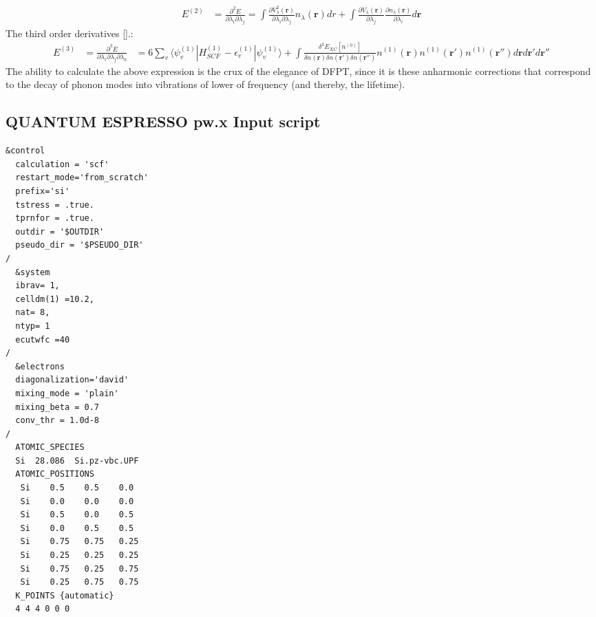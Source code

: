 \documentclass{article}
\numberwithin{equation}{section}
\begin{document}
\begin{spacing}{1.0}
\begin{align*}
E^{(2)}&=\frac{\partial^2 E}{\partial \lambda_i\partial \lambda_j}=\int \frac{\partial V^2_{\lambda}(\pmb{r})}{\partial \lambda_i\partial \lambda_j}n_{\lambda}(\pmb{r})dr+\int\frac{\partial V_{\lambda}(\pmb{r})}{\partial \lambda_j}\frac{\partial n_{\lambda}(\pmb{r})}{\partial \lambda_i}d\pmb{r}
\end{align*}
The third order derivatives [].:
\begin{align*}
E^{(3)}&=\frac{\partial^3 E}{\partial \lambda_i\partial \lambda_j\partial \lambda_k}&=6 \sum_v\langle\psi_v^{(1)}|H^{(1)}_{SCF}-\epsilon_v^{(1)}|\psi_v^{(1)}\rangle +\int \frac{\delta^3E_{XC}[n^{(0)}]}{\delta n(\pmb{r}) \delta n(\pmb{r'}) \delta n(\pmb{r''})}n^{(1)}(\pmb{r})n^{(1)}(\pmb{r'}) n^{(1)}(\pmb{r''}) d\pmb{r}d\pmb{r'}d\pmb{r''}
\end{align*}
The ability to calculate the above expression is the crux of the elegance of DFPT, since it is these anharmonic corrections that correspond to the decay of phonon modes into vibrations of lower of frequency (and thereby, the lifetime).
\newpage
\subsection*{QUANTUM ESPRESSO pw.x Input script}
\begin{verbatim}
&control 
  calculation = 'scf' 
  restart_mode='from_scratch' 
  prefix='si' 
  tstress = .true. 
  tprnfor = .true. 
  outdir = '$OUTDIR' 
  pseudo_dir = '$PSEUDO_DIR' 
/
  &system 
  ibrav= 1, 
  celldm(1) =10.2,
  nat= 8, 
  ntyp= 1 
  ecutwfc =40  
/ 
  &electrons 
  diagonalization='david' 
  mixing_mode = 'plain' 
  mixing_beta = 0.7 
  conv_thr = 1.0d-8 
/ 
  ATOMIC_SPECIES 
  Si  28.086  Si.pz-vbc.UPF
  ATOMIC_POSITIONS 
   Si    0.5    0.5    0.0
   Si    0.0    0.0    0.0
   Si    0.5    0.0    0.5
   Si    0.0    0.5    0.5
   Si    0.75   0.75   0.25
   Si    0.25   0.25   0.25
   Si    0.75   0.25   0.75
   Si    0.25   0.75   0.75
  K_POINTS {automatic} 
  4 4 4 0 0 0
\end{verbatim}
\end{spacing}
\end{document}
